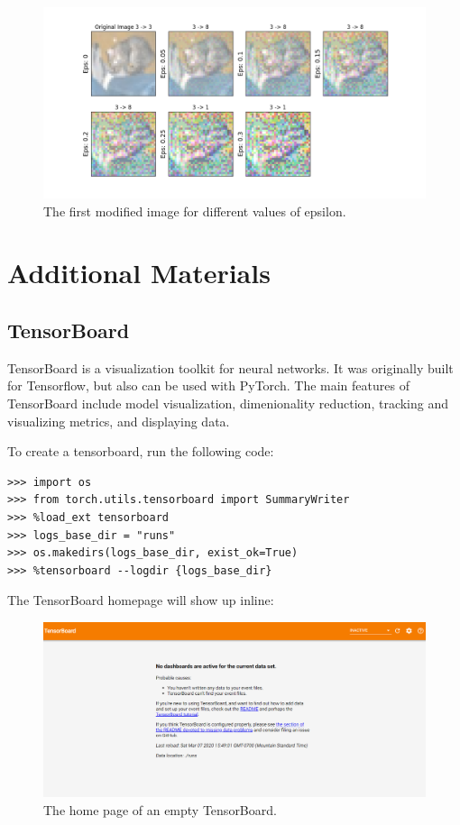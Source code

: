 \begin{figure}[H]
\includegraphics[width=\textwidth]{figures/perturbed_updated.png}
\caption{The first modified image for different values of epsilon.}
\label{fig:perturbed}
\end{figure}

\newpage

\section*{Additional Materials}
\subsection*{TensorBoard}

TensorBoard is a visualization toolkit for neural networks.
It was originally built for Tensorflow, but also can be used with PyTorch.
The main features of TensorBoard include model visualization, dimenionality reduction, tracking and visualizing metrics, and displaying data.

To create a tensorboard, run the following code:
\begin{lstlisting}
>>> import os
>>> from torch.utils.tensorboard import SummaryWriter
>>> %load_ext tensorboard
>>> logs_base_dir = "runs"
>>> os.makedirs(logs_base_dir, exist_ok=True)
>>> %tensorboard --logdir {logs_base_dir}
\end{lstlisting}
The TensorBoard homepage will show up inline:
\begin{figure}[H] %
    \centering
    \includegraphics[width=\textwidth]{figures/tensor_board_home.png}

\caption{The home page of an empty TensorBoard.}
\label{fig:tboard_home}
\end{figure}

